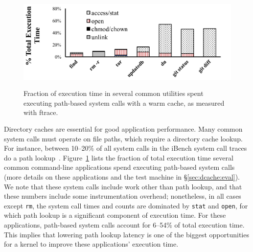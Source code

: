 


\begin{figure}[t]
\scriptsize
\centering
\includegraphics[width=4.5in]{dcache/plots/syscall-percentage.pdf} \\
\caption[Fraction of execution time on path-based system calls.]
{Fraction of execution time in several common utilities spent
executing path-based system calls with a warm cache, as measured with ftrace.}
\label{fig:dcache:lookup-frac}
\end{figure}


Directory caches are essential for good application performance.
Many common system calls must operate on file paths,
which require a directory cache lookup.
For instance, between 10--20\% of all system calls in the iBench system call traces do a path lookup~\citep{filenotafile}. 
Figure~\ref{fig:dcache:lookup-frac} lists the fraction of total execution time
several common command-line applications spend executing path-based system calls
(more details on these applications and the test machine in \S\ref{sec:dcache:eval}).
We note that these system calls include work other than path lookup,
and that these numbers include some instrumentation overhead;
nonetheless, in all cases except {\tt rm},
the system call times and counts are dominated by
{\tt stat} and {\tt open}, for which 
path lookup is a significant component of execution time.
For these applications, path-based system calls account for 6--54\% of total execution time.
This implies that
lowering path lookup latency is
 one of the  biggest 
opportunities for a kernel to improve these applications' execution time.




